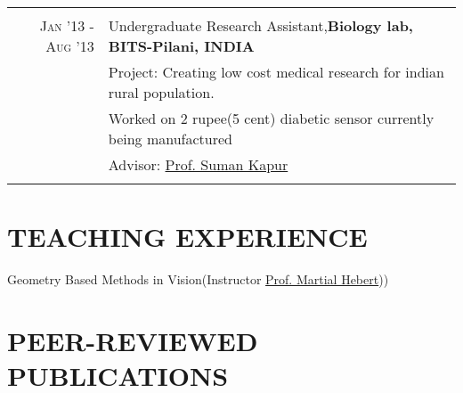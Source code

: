 \documentclass[7pt]{article}
\begin{document}
\begin{small}
\begin{tabular}{rl}
  \vspace{-2 mm}
&\\


 \textsc{Jan '13 - Aug '13 } &  Undergraduate Research Assistant,\bf{Biology lab, BITS-Pilani, INDIA}\\
 & Project: Creating low cost medical research for indian rural population. \\ & Worked on 2 rupee(5 cent) diabetic sensor currently being manufactured\\
&\normalsize \small Advisor: 
\href{http://www.bits-pilani.ac.in/Hyderabad/sumankapur/Profile} {Prof. Suman Kapur}\\&\\

\end{tabular}

\vspace{-4 mm}
\section{TEACHING EXPERIENCE} 
Geometry Based Methods in Vision(Instructor \href{http://www.cs.cmu.edu/~hebert/} {Prof. Martial Hebert}))

\section{PEER-REVIEWED PUBLICATIONS} 



\end{small}
\end{document}
